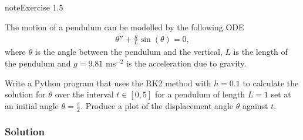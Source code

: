 \documentclass[letterpaper,10pt,english]{jupyterBook}
\begin{document}
\begin{sphinxadmonition}{note}{Exercise 1.5}

\sphinxAtStartPar
The motion of a pendulum can be modelled by the following ODE
\begin{align*}
    \theta'' + \frac{g}{L} \sin(\theta) = 0,
\end{align*}
\sphinxAtStartPar
where \(\theta\) is the angle between the pendulum and the vertical, \(L\) is the length of the pendulum and \(g=9.81\) ms\(^{-2}\) is the acceleration due to gravity.

\begin{figure}[H]
\centering

\noindent{}
\end{figure}

\sphinxAtStartPar
Write a Python program that uses the RK2 method with \(h=0.1\) to calculate the solution for \(\theta\) over the interval \(t\in [0, 5]\) for a pendulum of length \(L = 1\) set at an initial angle \(\theta = \frac{\pi}{2}\). Produce a plot of the displacement angle \(\theta\) against \(t\).
\subsubsection*{Solution}

\begin{sphinxVerbatim}[commandchars=\\\{\}]
   
   



\end{sphinxVerbatim}
\end{sphinxadmonition}
\end{document}
